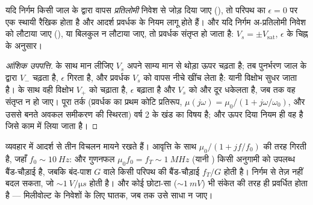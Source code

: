 \begin{proposition}\label{prop:b1:operational-amplifier:feedback}
यदि निर्गम किसी जाल के द्वारा वापस \emph{प्रतिलोमी} निवेश से जोड़ दिया जाए
(), तो परिपथ का $\epsilon = 0$ पर एक स्थायी रैखिक  होता है और आदर्श प्रवर्धक के नियम लागू होते हैं। और यदि
निर्गम अ-प्रतिलोमी निवेश को लौटाया जाए (), या बिलकुल
न लौटाया जाए, तो प्रवर्धक संतृप्त हो जाता है: $V_s = \pm V_{\mathrm{sat}}$,
$\epsilon$ के चिह्न के अनुसार।
\end{proposition}

\begin{proof}[आंशिक उपपत्ति]
 के साथ मान लीजिए $V_s$ अपने साम्य मान से थोड़ा ऊपर
चढ़ता है; तब पुनर्भरण जाल के द्वारा $V_-$ चढ़ता है, $\epsilon$
गिरता है, और प्रवर्धक $V_s$ को वापस नीचे खींच लेता है: यानी विक्षोभ सुधर जाता
है।  के साथ वही विक्षोभ $V_+$ को चढ़ाता है,
$\epsilon$ बढ़ाता है और $V_s$ को और दूर धकेलता है, जब तक वह संतृप्त न हो जाए।
पूरा तर्क (प्रवर्धक का प्रथम कोटि प्रतिरूप, $\mu(j\omega)
= \mu_0/(1 + j\omega/\omega_0)$, और उससे बनते अवकल समीकरण की स्थिरता) वर्ष 2
के खंड का विषय है; और ऊपर दिया नियम ही वह है जिसे काम में लिया जाता है।
\end{proof}

\begin{remark}\label{rem:b1:operational-amplifier:real}
व्यवहार में आदर्श से तीन विचलन मायने रखते हैं। 
आवृत्ति के साथ $\mu_0/(1 + jf/f_0)$ की तरह गिरती है, जहाँ $f_0 \sim \qty{10}{Hz}$:
और गुणनफल $\mu_0 f_0 = f_T \sim \qty{1}{MHz}$ (यानी \emph{}) किसी अनुगामी को उपलब्ध बैंड-चौड़ाई है, जबकि बंद-पाश 
$G$ वाले किसी परिपथ की बैंड-चौड़ाई $f_T/G$ होती है। निर्गम
\emph{} से तेज़ नहीं बदल सकता, जो $\sim\qty{1}{V/\micro s}$ होती है।
और कोई छोटा-सा \emph{} ($\sim\qty{1}{mV}$) भी संकेत की
तरह ही प्रवर्धित होता है --- मिलीवोल्ट के निवेशों के लिए घातक, जब तक उसे
साधा न जाए।
\end{remark}

